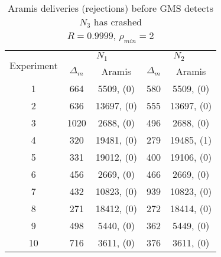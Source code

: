 \begin{table}[p]
    \begin{center}
        \renewcommand{\arraystretch}{1.25}
        \begin{tabular}{|c|c|c|c|c|}
            \hline
            \multirow{2}{*}{Experiment} & \multicolumn{2}{|c|}{$N_1$} & \multicolumn{2}{|c|}{$N_2$} \\ \cline{2-5}
                                                       & $\Delta_m$&\textsf{Aramis} & $\Delta_m$&\textsf{Aramis} \\ \hline \hline
            1 & 664 & 5509, (0) & 580 & 5509, (0) \\ \hline
            2 & 636 & 13697, (0) & 555 & 13697, (0) \\ \hline
            3 & 1020 & 2688, (0) & 496 & 2688, (0) \\ \hline
            4 & 320 & 19481, (0) & 279 & 19485, (1) \\ \hline
            5 & 331 & 19012, (0) & 400 & 19106, (0) \\ \hline
            6 & 456 & 2669, (0) & 466 & 2669, (0) \\ \hline
            7 & 432 & 10823, (0) & 939 & 10823, (0) \\ \hline
            8 & 271 & 18412, (0) & 272 & 18414, (0) \\ \hline
            9 & 498 & 5440, (0) & 362 & 5449, (0) \\ \hline
            10 & 716 & 3611, (0) & 376 & 3611, (0) \\ \hline
        \end{tabular}
        \caption{\textsf{Aramis} deliveries (rejections) before GMS detects $N_3$ has crashed \\ $R=0.9999$, $\rho_{min}=2$}
        \label{table:crashed_node_rho2}
    \end{center}
\end{table}

